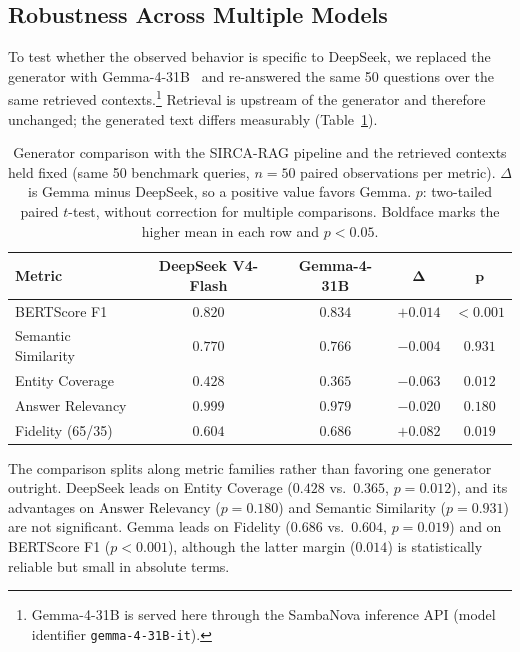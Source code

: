 \documentclass[runningheads]{llncs}
\newcommand{\sirca}{\textsc{SIRCA-RAG}}
\begin{document}
\subsection{Robustness Across Multiple Models}
\label{sec:multi_llm}

To test whether the observed behavior is specific to DeepSeek, we replaced the generator with Gemma-4-31B~\cite{googledeepmind2026gemma4} and re-answered the same 50 questions over the same retrieved contexts.\footnote{Gemma-4-31B is served here through the SambaNova inference API (model identifier \texttt{gemma-4-31B-it}).} Retrieval is upstream of the generator and therefore unchanged; the generated text differs measurably (Table~\ref{tab:multi_llm}).

\begin{table}[!ht]
\centering
\caption{Generator comparison with the \sirca{} pipeline and the retrieved contexts held fixed (same 50 benchmark queries, $n{=}50$ paired observations per metric). $\Delta$ is Gemma minus DeepSeek, so a positive value favors Gemma. $p$: two-tailed paired $t$-test, without correction for multiple comparisons. Boldface marks the higher mean in each row and $p{<}0.05$.}
\label{tab:multi_llm}
\footnotesize
\begin{tabular}{l c c c c}
\toprule
\textbf{Metric} & \textbf{DeepSeek V4-Flash} & \textbf{Gemma-4-31B} & $\boldsymbol{\Delta}$ & $\boldsymbol{p}$ \\
\midrule
BERTScore F1        & $0.820$          & $\mathbf{0.834}$ & $+0.014$ & $\mathbf{<0.001}$ \\
Semantic Similarity & $\mathbf{0.770}$ & $0.766$          & $-0.004$ & $0.931$ \\
Entity Coverage     & $\mathbf{0.428}$ & $0.365$          & $-0.063$ & $\mathbf{0.012}$ \\
Answer Relevancy    & $\mathbf{0.999}$ & $0.979$          & $-0.020$ & $0.180$ \\
\midrule
Fidelity (65/35)    & $0.604$          & $\mathbf{0.686}$ & $+0.082$ & $\mathbf{0.019}$ \\
\bottomrule
\end{tabular}
\end{table}

The comparison splits along metric families rather than favoring one generator outright. DeepSeek leads on Entity Coverage ($0.428$ vs.\ $0.365$, $p{=}0.012$), and its advantages on Answer Relevancy ($p{=}0.180$) and Semantic Similarity ($p{=}0.931$) are not significant. Gemma leads on Fidelity ($0.686$ vs.\ $0.604$, $p{=}0.019$) and on BERTScore F1 ($p{<}0.001$), although the latter margin ($0.014$) is statistically reliable but small in absolute terms.
\end{document}
